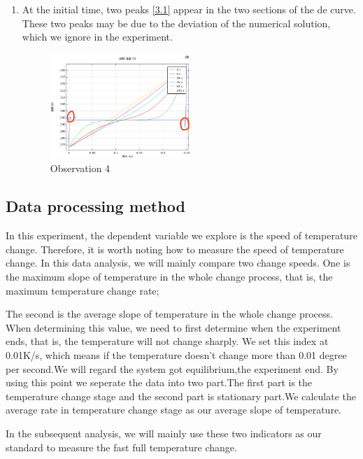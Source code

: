 \documentclass[12pt]{article}
\numberwithin{equation}{section}
\begin{document}
\begin{enumerate}
 \item At the initial time, two peaks \ref{3.1} appear in the two sections of the de curve. These two peaks may be due to the deviation of the numerical solution, which we ignore in the experiment.
  \begin{figure}[H] %
\centering %
\includegraphics[width=0.5\textwidth]{Observation4.png} %
\caption{Observation 4} %
\end{figure} 
 
 
 
\end{enumerate}

\subsection{Data processing method}
In this experiment, the dependent variable we explore is the speed of temperature change. Therefore, it is worth noting how to measure the speed of temperature change. In this data analysis, we will mainly compare two change speeds. One is the maximum slope of temperature in the whole change process, that is, the maximum temperature change rate; 


The second is the average slope of temperature in the whole change process. When determining this value, we need to first determine when the experiment ends, that is, the temperature will not change sharply. We set this index at 0.01K/s, which means if the temperature doesn't change more than 0.01 degree per second.We will regard the system got equilibrium,the experiment end. By using this point we seperate the data into two part.The first part is the temperature change stage and the second part is stationary part.We calculate the average rate in temperature change stage as our average slope of temperature. 



In the subsequent analysis, we will mainly use these two indicators as our standard to measure the fast full temperature change.
\end{document}
